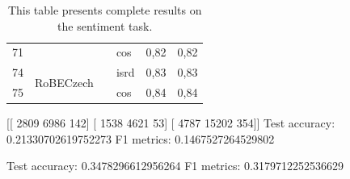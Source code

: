 \begin{table}[]
{\begin{tabular}{|l|l|l|l||ll|}
71 &                            &                           & cos                   & 0,82   & 0,82 \\ \cline{1-2} \cline{4-6} 
74 & \multirow{2}{*}{RoBECzech} &                           & isrd                  & 0,83   & 0,83 \\ \cline{1-1} \cline{4-6} 
75 &                            &                           & cos                   & 0,84   & 0,84 \\ \hline
\end{tabular}}
\caption{This table presents complete results on the sentiment task. }
\label{tab:res_all_sent}
\end{table}







%




[[ 2809  6986   142]
 [ 1538  4621    53]
 [ 4787 15202   354]]
Test accuracy: 0.21330702619752273
F1 metrics: 0.1467527264529802

 Test accuracy: 0.3478296612956264
F1 metrics: 0.3179712252536629
 

















